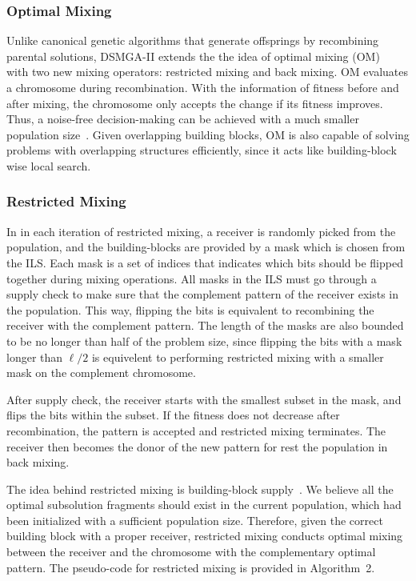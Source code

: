 \documentclass{sig-alternate-05-2015}
\begin{document}
\subsubsection{Optimal Mixing}
Unlike canonical genetic algorithms that generate offsprings by recombining parental solutions, DSMGA-II extends the the idea of optimal mixing (OM)~\cite{thierens:OM} with two new mixing operators: restricted mixing and back mixing. OM evaluates a chromosome during recombination. With the information of fitness before and after mixing, the chromosome only accepts the change if its fitness improves. Thus, a noise-free decision-making can be achieved with a much smaller population size~\cite{goldberg:buildingblock}. Given overlapping building blocks, OM is also capable of solving problems with overlapping structures efficiently, since it acts like building-block wise local search.


\subsubsection{Restricted Mixing}

In in each iteration of restricted mixing, a receiver is randomly picked from the population, and the building-blocks are provided by a mask which is chosen from the ILS. 
Each mask is a set of indices that indicates which bits should be flipped together during mixing operations. 
All masks in the ILS must go through a supply check to make sure that the complement pattern of the receiver exists in the population. 
This way, flipping the bits is equivalent to recombining the receiver with the complement pattern. 
The length of the masks are also bounded to be no longer than half of the problem size, since flipping the bits with a mask longer than $\ell/2$ is equivelent to performing restricted mixing with a smaller mask on the complement chromosome. 


After supply check, the receiver starts with the smallest subset in the mask, and flips the bits within the subset. 
If the fitness does not decrease after recombination, the pattern is accepted and restricted mixing terminates. 
The receiver then becomes the donor of the new pattern for rest the population in back mixing. 


The idea behind restricted mixing is building-block supply~\cite{goldberg:buildingblock}. We believe all the optimal subsolution fragments should exist in the current population, which had been initialized with a sufficient population size. Therefore, given the correct building block with a proper receiver, restricted mixing conducts optimal mixing between the receiver and the chromosome with the complementary optimal pattern. 
The pseudo-code for  restricted mixing is provided in Algorithm~2.
\end{document}

